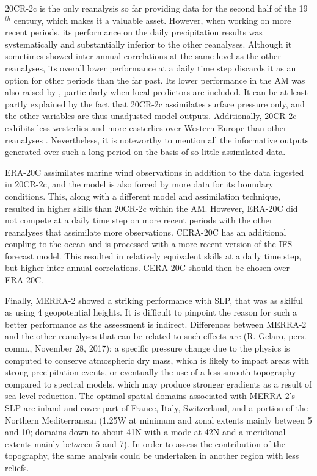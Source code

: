 \documentclass{ametsoc}
\begin{document}
20CR-2c is the only reanalysis so far providing data for the second half of the 19$^{th}$ century, which makes it a valuable asset. However, when working on more recent periods, its performance on the daily precipitation results was systematically and substantially inferior to the other reanalyses. Although it sometimes showed inter-annual correlations at the same level as the other reanalyses, its overall lower performance at a daily time step discards it as an option for other periods than the far past. Its lower performance in the AM was also raised by \citet[][]{Dayon2015}, particularly when local predictors are included. It can be at least partly explained by the fact that 20CR-2c assimilates surface pressure only, and the other variables are thus unadjusted model outputs. Additionally, 20CR-2c exhibits less westerlies and more easterlies over Western Europe than other reanalyses \citep{Rohrer2018}. Nevertheless, it is noteworthy to mention all the informative outputs generated over such a long period on the basis of so little assimilated data.

ERA-20C assimilates marine wind observations in addition to the data ingested in 20CR-2c, and the model is also forced by more data for its boundary conditions. This, along with a different model and assimilation technique, resulted in higher skills than 20CR-2c within the AM. However, ERA-20C did not compete at a daily time step on more recent periods with the other reanalyses that assimilate more observations. CERA-20C has an additional coupling to the ocean and is processed with a more recent version of the IFS forecast model. This resulted in relatively equivalent skills at a daily time step, but higher inter-annual correlations. CERA-20C should then be chosen over ERA-20C.

Finally, MERRA-2 showed a striking performance with SLP, that was as skilful as using 4 geopotential heights. It is difficult to pinpoint the reason for such a better performance as the assessment is indirect. Differences between MERRA-2 and the other reanalyses that can be related to such effects are (R. Gelaro, pers. comm., November 28, 2017): a specific pressure change due to the physics is computed to conserve atmospheric dry mass, which is likely to impact areas with strong precipitation events, or eventually the use of a less smooth topography compared to spectral models, which may produce stronger gradients as a result of sea-level reduction. The optimal spatial domains associated with MERRA-2's SLP are inland and cover part of France, Italy, Switzerland, and a portion of the Northern Mediterranean (1.25\degree W at minimum and zonal extents mainly between 5 and 10\degree; domains down to about 41\degree N with a mode at 42\degree N and a meridional extents mainly between 5 and 7\degree). In order to assess the contribution of the topography, the same analysis could be undertaken in another region with less reliefs.
\end{document}
